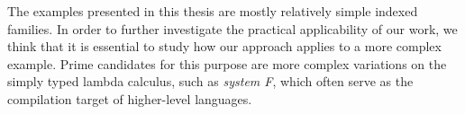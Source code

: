 \documentclass[a4paper,msc,twosized=semi]{uustthesis}
\let\oldemph\emph
\renewcommand\emph[1]{{\large\oldemph{#1}}}
\begin{document}
  The examples presented in this thesis are mostly relatively simple indexed families. 
  In order to further investigate the practical applicability of our work, we think 
  that it is essential to study how our approach applies to a more complex example. 
  Prime candidates for this purpose are more complex variations on the simply typed 
  lambda calculus, such as \emph{system F}, which often serve as the compilation 
  target of higher-level languages. \cite{plutusspec2019}


\backmatter
\listoffigures



\end{document}
